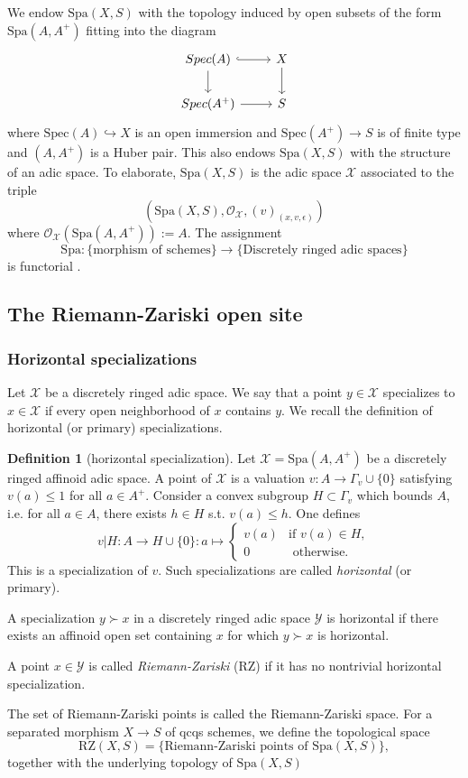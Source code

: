 \documentclass{amsart}
\def\Spa{\textrm{Spa}}
\def\Spec{\textrm{Spec}}
\def\RZ{\textrm{RZ}}
\theoremstyle{definition}
\newtheorem{definition}[theorem]{Definition}
\numberwithin{equation}{section}
\begin{document}
 We endow $\Spa(X,S)$ with the topology induced by open subsets of the form $\Spa(A,A^+)$ fitting into the diagram
 \[
 \begin{tikzcd}
 	\Spec(A)\ar[r,hook]\ar[d]& X\ar[d]\\
 	\Spec(A^+)\ar[r]&S
 \end{tikzcd}
 \]
 where $\Spec(A)\hookrightarrow X$ is an open immersion and $\Spec(A^+)\to S$ is of finite type and $(A,A^+)$ is a Huber pair. This also endows $\Spa(X,S)$ with the structure of an adic space. To elaborate, $\Spa(X,S)$ is the adic space $\mathcal{X}$ associated to the triple
 \[
 (\Spa(X,S),\mathcal{O}_{\mathcal{X}},(v)_{(x,v,\epsilon)})
 \]
 where $\mathcal{O}_{\mathcal{X}}(\Spa(A,A^+)):=A$.
 The assignment
 \[
 \Spa: \big\{\textrm{morphism of schemes} \big\}\to \big\{\textrm{Discretely ringed adic spaces}\big\}
 \]
 is functorial \cite[Lemma 2.1]{HTame}.
 


\subsection{The Riemann-Zariski open site}
 \subsubsection*{Horizontal specializations}
Let $\mathcal{X}$ be a discretely ringed adic space. We say that a point $y \in \mathcal{X}$ specializes to $x \in \mathcal{X}$ if every open neighborhood of $x$ contains $y$. We recall the definition of horizontal (or primary) specializations.
\begin{definition}[horizontal specialization]
	Let $\mathcal{X}=\Spa(A,A^+)$ be a discretely ringed  affinoid adic space. A point of $\mathcal{X}$ is a valuation $v:A\to \Gamma_{v}\cup \{0\}$ satisfying $v(a)\leq 1$ for all $a\in A^+$. Consider a convex subgroup $H\subset \Gamma_v$ which bounds $A$, i.e. for all $a\in A$, there exists $h\in H$ s.t. $v(a)\leq h$. One defines
	\[
	v|H:A\to H\cup \{0\}: a\mapsto \begin{cases}
		v(a) &\textrm{if }v(a)\in H, \\ 0 &\textrm{ otherwise.}
	\end{cases}
	\]
	This is a specialization of $v$. Such specializations are called \textit{horizontal} (or primary).
	
    A specialization $y \succ x$ in a discretely ringed adic space $\mathcal{Y}$ is horizontal if there exists an affinoid open set containing $x$ for which $y \succ x$ is horizontal.

	
    A point $x \in \mathcal{Y}$ is called \textit{Riemann-Zariski} (RZ) if it has no nontrivial horizontal specialization.
\end{definition}
The set of Riemann-Zariski points is called the Riemann-Zariski space. For a separated morphism $X\to S$ of qcqs schemes, we define the topological space
 \[\RZ(X,S)=\{\textrm{Riemann-Zariski points of } \Spa(X,S)\},\]
together with the underlying topology of $\Spa(X,S)$
\end{document}
